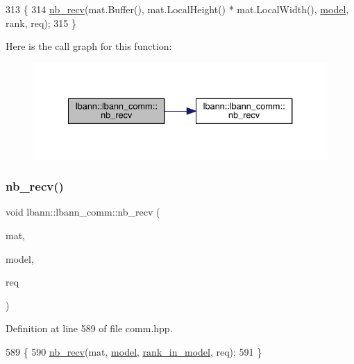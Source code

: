 \begin{DoxyCode}
313                                                       \{
314   \hyperlink{classlbann_1_1lbann__comm_aac24e8802602c73efddb455274e158f4}{nb\_recv}(mat.Buffer(), mat.LocalHeight() * mat.LocalWidth(), \hyperlink{namespacelbann_adee41f31f15f3906cbdcce4a1417eb56a20f35e630daf44dbfa4c3f68f5399d8c}{model}, rank, req);
315 \}
\end{DoxyCode}
Here is the call graph for this function\+:\nopagebreak
\begin{figure}[H]
\begin{center}
\leavevmode
\includegraphics[width=334pt]{classlbann_1_1lbann__comm_abec714b3f80361f104eaa004d906798b_cgraph}
\end{center}
\end{figure}
\mbox{\label{classlbann_1_1lbann__comm_ad76ddffcad6e996b8da2ba7670d20b24}} 
\subsubsection{\texorpdfstring{nb\+\_\+recv()}{nb\_recv()}\hspace{0.1cm}{\footnotesize\ttfamily [5/9]}}
{\footnotesize\ttfamily void lbann\+::lbann\+\_\+comm\+::nb\+\_\+recv (\begin{DoxyParamCaption}\item[{\hyperlink{base_8hpp_a68f11fdc31b62516cb310831bbe54d73}{Mat} \&}]{mat,  }\item[{int}]{model,  }\item[{El\+::mpi\+::\+Request$<$ Data\+Type $>$ \&}]{req }\end{DoxyParamCaption})\hspace{0.3cm}{\ttfamily [inline]}}



Definition at line 589 of file comm.\+hpp.


\begin{DoxyCode}
589                                                                  \{
590     \hyperlink{classlbann_1_1lbann__comm_aac24e8802602c73efddb455274e158f4}{nb\_recv}(mat, \hyperlink{namespacelbann_adee41f31f15f3906cbdcce4a1417eb56a20f35e630daf44dbfa4c3f68f5399d8c}{model}, \hyperlink{classlbann_1_1lbann__comm_a0dcccd57c2b591eb7682e192e0a09033}{rank\_in\_model}, req);
591   \}
\end{DoxyCode}
\mbox{\label{classlbann_1_1lbann__comm_aec876be95ab91bfff6337f06adc6a797}} 
